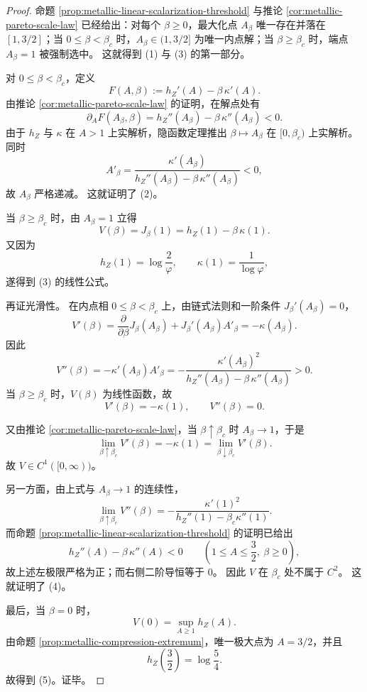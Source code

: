 \begin{proof}
命题 \ref{prop:metallic-linear-scalarization-threshold} 与推论
\ref{cor:metallic-pareto-scale-law} 已经给出：对每个 \(\beta\ge 0\)，最大化点 \(A_\beta\) 唯一存在并落在 \([1,3/2]\)；当 \(0\le \beta<\beta_c\) 时，\(A_\beta\in(1,3/2]\) 为唯一内点解；当 \(\beta\ge \beta_c\) 时，端点 \(A_\beta=1\) 被强制选中。
这就得到 (1) 与 (3) 的第一部分。

对 \(0\le \beta<\beta_c\)，定义
\[
F(A,\beta):=h_Z'(A)-\beta\,\kappa'(A).
\]
由推论 \ref{cor:metallic-pareto-scale-law} 的证明，在解点处有
\[
\partial_A F(A_\beta,\beta)=h_Z''(A_\beta)-\beta\,\kappa''(A_\beta)<0.
\]
由于 \(h_Z\) 与 \(\kappa\) 在 \(A>1\) 上实解析，隐函数定理推出 \(\beta\mapsto A_\beta\) 在 \([0,\beta_c)\) 上实解析。
同时
\[
A'_\beta
=
\frac{\kappa'(A_\beta)}{h_Z''(A_\beta)-\beta\,\kappa''(A_\beta)}
<0,
\]
故 \(A_\beta\) 严格递减。
这就证明了 (2)。

当 \(\beta\ge \beta_c\) 时，由 \(A_\beta=1\) 立得
\[
V(\beta)=J_\beta(1)=h_Z(1)-\beta\,\kappa(1).
\]
又因为
\[
h_Z(1)=\log\!\frac{2}{\varphi},
\qquad
\kappa(1)=\frac{1}{\log\varphi},
\]
遂得到 (3) 的线性公式。

再证光滑性。
在内点相 \(0\le \beta<\beta_c\) 上，由链式法则和一阶条件 \(J_\beta'(A_\beta)=0\)，
\[
V'(\beta)
=
\frac{\partial}{\partial\beta}J_\beta(A_\beta)
+J_\beta'(A_\beta)A'_\beta
=
-\kappa(A_\beta).
\]
因此
\[
V''(\beta)=-\kappa'(A_\beta)A'_\beta
=
-\frac{\kappa'(A_\beta)^2}{h_Z''(A_\beta)-\beta\,\kappa''(A_\beta)}
>0.
\]
当 \(\beta\ge \beta_c\) 时，\(V(\beta)\) 为线性函数，故
\[
V'(\beta)=-\kappa(1),
\qquad
V''(\beta)=0.
\]

又由推论 \ref{cor:metallic-pareto-scale-law}，当 \(\beta\uparrow\beta_c\) 时 \(A_\beta\to 1\)，于是
\[
\lim_{\beta\uparrow\beta_c}V'(\beta)
=
-\kappa(1)
=
\lim_{\beta\downarrow\beta_c}V'(\beta).
\]
故 \(V\in C^1([0,\infty))\)。

另一方面，由上式与 \(A_\beta\to 1\) 的连续性，
\[
\lim_{\beta\uparrow\beta_c}V''(\beta)
=
-\frac{\kappa'(1)^2}{h_Z''(1)-\beta_c\kappa''(1)}.
\]
而命题 \ref{prop:metallic-linear-scalarization-threshold} 的证明已给出
\[
h_Z''(A)-\beta\,\kappa''(A)<0
\qquad
\left(1\le A\le \frac32,\ \beta\ge 0\right),
\]
故上述左极限严格为正；而右侧二阶导恒等于 \(0\)。
因此 \(V\) 在 \(\beta_c\) 处不属于 \(C^2\)。
这就证明了 (4)。

最后，当 \(\beta=0\) 时，
\[
V(0)=\sup_{A\ge 1}h_Z(A).
\]
由命题 \ref{prop:metallic-compression-extremum}，唯一极大点为 \(A=3/2\)，并且
\[
h_Z\!\left(\frac32\right)=\log\!\frac54.
\]
故得到 (5)。证毕。
\end{proof}

\endinput

